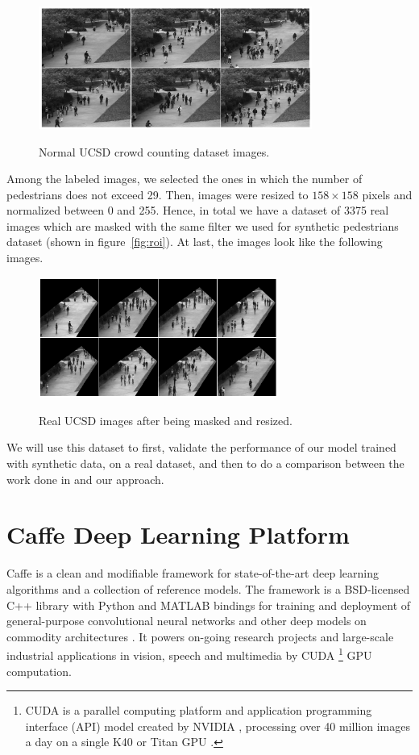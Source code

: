 \begin{figure}[H]
	\centering
	{\includegraphics[width=0.8\textwidth]{images/normalucsd}}
	\caption{Normal UCSD crowd counting dataset images.}
	\label{fig:ucsdorg}
\end{figure}

\indent Among the labeled images, we selected the ones in which the number of pedestrians does not exceed 29. Then, images were resized to  $158\times158$ pixels and normalized between 0 and 255. Hence, in total we have a dataset of 3375 real images which are masked with the same filter we used for synthetic pedestrians dataset (shown in figure~\ref{fig:roi}). At last, the images look like the following images.

\begin{figure}[H]
	\centering
	{\includegraphics[width=0.7\textwidth]{images/testucsd}}
	\caption{Real UCSD images after being masked and resized.}
	\label{fig:testucsd}
\end{figure}


\indent We will use this dataset to first, validate the performance of our model trained with synthetic data, on a real dataset, and then to do a comparison between the work done in \cite{chan2008privacy} and our approach.



\section{Caffe Deep Learning Platform}

Caffe is a clean and modifiable framework for state-of-the-art deep learning algorithms and a collection of reference models. The framework is a BSD-licensed C++ library with Python and MATLAB bindings for training and deployment of general-purpose convolutional neural networks and other deep models on commodity architectures \cite{jia2014caffe}. It powers on-going research projects and large-scale industrial applications in vision, speech and multimedia by CUDA \footnote{CUDA is a parallel computing platform and application programming interface (API) model created by NVIDIA \cite{cuda}, processing over 40 million images a day on a single K40 or Titan GPU \cite{jia2014caffe}.}  GPU computation.

